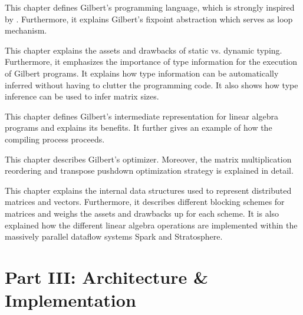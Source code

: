 
\noindent This chapter defines Gilbert's programming language, which is strongly inspired by \matlab. 
Furthermore, it explains Gilbert's fixpoint abstraction which serves as loop mechanism.

\vspace{3mm}


\noindent This chapter explains the assets and drawbacks of static vs. dynamic typing.
Furthermore, it emphasizes the importance of type information for the execution of Gilbert programs. 
It explains how type information can be automatically inferred without having to clutter the programming code.
It also shows how type inference can be used to infer matrix sizes.

\vspace{3mm}


\noindent This chapter defines Gilbert's intermediate representation for linear algebra programs and explains its benefits.
It further gives an example of how the compiling process proceeds.

\vspace{3mm}


\noindent This chapter describes Gilbert's optimizer.
Moreover, the matrix multiplication reordering and transpose pushdown optimization strategy is explained in detail.

 \vspace{3mm}


\noindent This chapter explains the internal data structures used to represent distributed matrices and vectors.
Furthermore, it describes different blocking schemes for matrices and weighs the assets and drawbacks up for each scheme.
It is also explained how the different linear algebra operations are implemented within the massively parallel dataflow systems Spark and Stratosphere.

\vspace{3mm}

\section*{Part III: Architecture \& Implementation}

